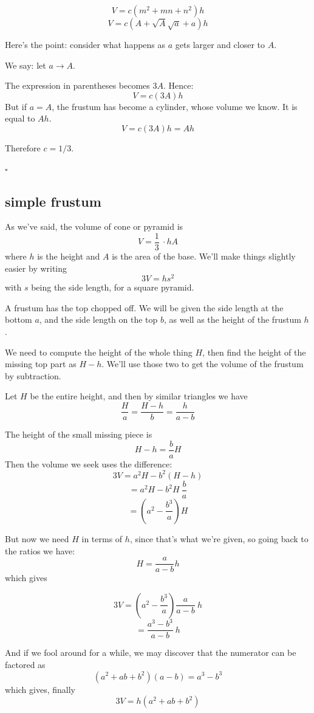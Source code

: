\documentclass[11pt, oneside]{article}
\begin{document}
\[ V = c (m^2 + mn + n^2) h \]
\[ V = c (A + \sqrt{A} \sqrt{a} + a) h \]

Here's the point:  consider what happens as $a$ gets larger and closer to $A$.

We say:  let $a \rightarrow A$.

The expression in parentheses becomes $3A$.  Hence:
\[ V = c(3A)h \]
But if $a = A$, the frustum has become a cylinder, whose volume we know.  It is equal to $Ah$. 
\[ V = c(3A)h = Ah \]

Therefore $c = 1/3$.

$\square$

\subsection*{simple frustum}

As we've said, the volume of cone or pyramid is 
\[ V = \frac{1}{3} \ \cdot hA \]
where $h$ is the height and $A$ is the area of the base.  We'll make things slightly easier by writing
\[ 3V = hs^2 \]
with $s$ being the side length, for a square pyramid.

A frustum has the top chopped off.   We will be given the side length at the bottom $a$, and the side length on the top $b$, as well as the height of the frustum $h$.

We need to compute the height of the whole thing $H$, then find the height of the missing top part as $H-h$.  We'll use those two to get the volume of the frustum by subtraction.

Let $H$ be the entire height, and then by similar triangles we have
\[ \frac{H}{a} = \frac{H-h}{b} = \frac{h}{a-b} \]

The height of the small missing piece is 
\[ H - h = \frac{b}{a} H \]
Then the volume we seek uses the difference:
\[ 3V = a^2 H - b^2 (H-h)  \]
\[ = a^2H - b^2H \ \frac{b}{a} \]
\[ = (a^2 - \frac{b^3}{a}) H \]

But now we need $H$ in terms of $h$, since that's what we're given, so going back to the ratios we have:
\[ H = \frac{a}{a-b} h \]
which gives

\[ 3V = (a^2 - \frac{b^3}{a}) \frac{a}{a-b} \ h \]
\[ = \frac{a^3 - b^3}{a-b} \ h \]

And if we fool around for a while, we may discover that the numerator can be factored as
\[ (a^2 + ab + b^2)(a - b) = a^3 - b^3 \]
which gives, finally
\[ 3V = h (a^2 + ab + b^2) \]
\end{document}
